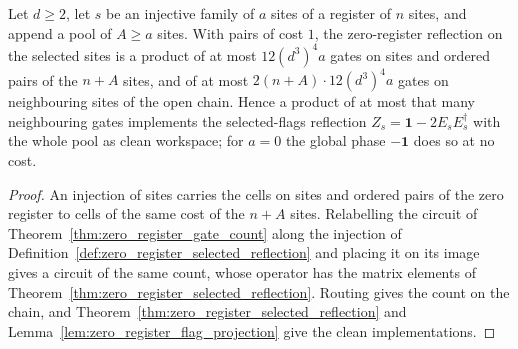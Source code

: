 \begin{theorem}
    \label{thm:zero_register_selected_gate_count}
    \leanok
    Let $d\geq2$, let $s$ be an injective family of $a$ sites of a register of $n$ sites,
    and append a pool of $A\geq a$ sites. With pairs of cost $1$, the zero-register reflection on
    the selected sites is a product of at most $12(d^3)^4a$ gates on sites and ordered pairs of
    the $n+A$ sites, and of at most $2(n+A)\cdot12(d^3)^4a$ gates on neighbouring sites of the
    open chain. Hence a product of at most that many neighbouring gates implements the
    selected-flags reflection $Z_s=\mathbf 1-2E_sE_s^\dagger$ with the whole pool as clean
    workspace; for $a=0$ the global phase $-\mathbf 1$ does so at no cost.
\end{theorem}
\begin{proof}\leanok
    An injection of sites carries the cells on sites and ordered pairs of the zero register to
    cells of the same cost of the $n+A$ sites. Relabelling the circuit of
    Theorem~\ref{thm:zero_register_gate_count} along the injection of
    Definition~\ref{def:zero_register_selected_reflection} and placing it on its image gives a
    circuit of the same count, whose operator has the matrix elements of
    Theorem~\ref{thm:zero_register_selected_reflection}. Routing gives the count on the chain,
    and Theorem~\ref{thm:zero_register_selected_reflection} and
    Lemma~\ref{lem:zero_register_flag_projection} give the clean implementations.
\end{proof}
